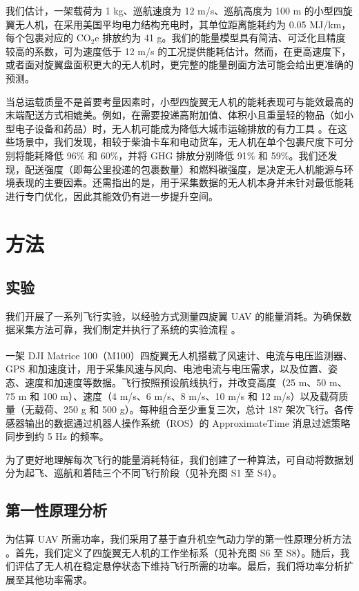 \documentclass{article}
\begin{document}
我们估计，一架载荷为 1 kg、巡航速度为 12 m/s、巡航高度为 100 m 的小型四旋翼无人机，在采用美国平均电力结构充电时，其单位距离能耗约为 0.05 MJ/km，每个包裹对应的 CO$_{2}$e 排放约为 41 g。我们的能量模型具有简洁、可泛化且精度较高的系数，可为速度低于 12 m/s 的工况提供能耗估计。然而，在更高速度下，或者面对旋翼盘面积更大的无人机时，更完整的能量剖面方法可能会给出更准确的预测。

当总运载质量不是首要考量因素时，小型四旋翼无人机的能耗表现可与能效最高的末端配送方式相媲美。例如，在需要投递高附加值、体积小且重量轻的物品（如小型电子设备和药品）时，无人机可能成为降低大城市运输排放的有力工具 \cite{Isik2021TransportationRates}。在这些场景中，我们发现，相较于柴油卡车和电动货车，无人机在单个包裹尺度下可分别将能耗降低 96\% 和 60\%，并将 GHG 排放分别降低 91\% 和 59\%。我们还发现，配送强度（即每公里投递的包裹数量）和燃料碳强度，是决定无人机能源与环境表现的主要因素。还需指出的是，用于采集数据的无人机本身并未针对最低能耗进行专门优化，因此其能效仍有进一步提升空间。  

\section{方法}

\subsection{实验}
我们开展了一系列飞行实验，以经验方式测量四旋翼 UAV 的能量消耗。为确保数据采集方法可靠，我们制定并执行了系统的实验流程 \cite{Rodrigues2021In-flightDelivery}。 

一架 DJI\textsuperscript{\textregistered} Matrice 100（M100）四旋翼无人机搭载了风速计、电流与电压监测器、GPS 和加速度计，用于采集风速与风向、电池电流与电压需求，以及位置、姿态、速度和加速度等数据。飞行按照预设航线执行，并改变高度（25 m、50 m、75 m 和 100 m）、速度（4 m/s、6 m/s、8 m/s、10 m/s 和 12 m/s）以及载荷质量（无载荷、250 g 和 500 g）。每种组合至少重复三次，总计 187 架次飞行。各传感器输出的数据通过机器人操作系统（ROS）的 ApproximateTime \cite{Foundation2010} 消息过滤策略同步到约 5 Hz 的频率。

为了更好地理解每次飞行的能量消耗特征，我们创建了一种算法，可自动将数据划分为起飞、巡航和着陆三个不同飞行阶段（见补充图 S1 至 S4）。

\subsection{第一性原理分析}
为估算 UAV 所需功率，我们采用了基于直升机空气动力学的第一性原理分析方法 \cite{Rotaru2017a}。首先，我们定义了四旋翼无人机的工作坐标系（见补充图 S6 至 S8）。随后，我们评估了无人机在稳定悬停状态下维持飞行所需的功率。最后，我们将功率分析扩展至其他功率需求。
\end{document}
